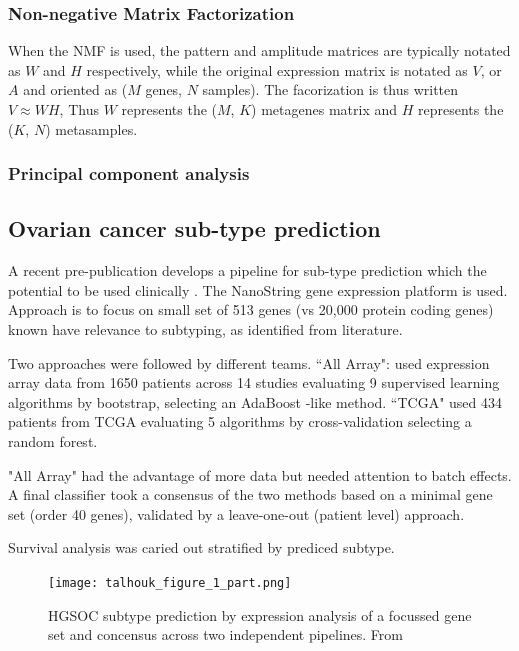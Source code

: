 \documentclass[tikz, 12pt,a4paper,oneside,fleqn]{article}
\begin{document}
\subsubsection{Non-negative Matrix Factorization}

When the NMF is used, the pattern and amplitude matrices are typically notated as $W$ and $H$ respectively, while the original expression matrix is notated as $V$, or $A$ and oriented as ($M$ genes, $N$ samples).   The facorization is thus written $V \approx W H$, Thus $W$ represents the ($M$, $K$) metagenes matrix and $H$ represents the ($K$, $N$) metasamples.

\subsubsection{Principal component analysis}

\subsection{Ovarian cancer sub-type prediction}

A recent pre-publication develops a pipeline for sub-type prediction which the potential to be used clinically \cite{Talhouk2020}.
The NanoString gene expression platform is used. Approach is to focus on small set of 513 genes (vs 20,000 protein coding genes) known have relevance to subtyping, as identified from literature.

Two approaches were followed by different teams.  ``All Array": used expression array data from 1650 patients across 14 studies evaluating 9 supervised learning algorithms by bootstrap, selecting an AdaBoost -like method. ``TCGA" used 434 patients from TCGA evaluating 5 algorithms by cross-validation selecting a random forest.

"All Array" had the advantage of more data but needed attention to batch effects. A final classifier took a consensus of the two methods based on a minimal gene set (order 40 genes), validated by a leave-one-out (patient level) approach.

Survival analysis was caried out stratified by prediced subtype.


\begin{figure}
\begin{center}
\texttt{[image: talhouk\_figure\_1\_part.png]}
\end{center}
\caption{HGSOC subtype prediction by expression analysis of a focussed gene set and concensus across two independent pipelines.  From \cite{Talhouk2020}}
\label{fig-talhouk_figure_1_part.png}
\end{figure}
\end{document}
